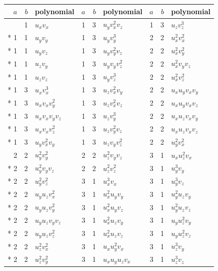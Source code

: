 \documentclass[10pt,a4paper]{article}
\makeatletter
\def\grouprule#1#2{\noalign{\marks\LTgroupmarks{\the\belowrulesep}\nobreak\vskip#1%
  \vskip\aboverulesep}\multispan\LT@cols\unskip{\leaders\hrule\@height#2\hfill\kern\z@}\cr
  \noalign{\penalty\LTrulebreak\vskip\belowrulesep\global\@lastruleclass\z@}}
\numberwithin{equation}{section}
\makeatother
\begin{document}
{\small\renewcommand{\arraystretch}{1.2}\begin{longtable}{@{}rrl@{\hspace{18pt}}rrl@{\hspace{18pt}}rrl@{}}\toprule
$a$ & $b$ & polynomial & $a$ & $b$ & polynomial & $a$ & $b$ & polynomial\\\midrule\endhead
\bottomrule\endfoot\endlastfoot
1 & 1 & $u_{x}v_{x}$ & 1 & 3 & $u_{y}v_{x}^{2}v_{z}$ & 1 & 3 & $u_{z}v_{z}^{3}$\\*
1 & 1 & $u_{y}v_{y}$ & 1 & 3 & $u_{y}v_{y}^{3}$ & 2 & 2 & $u_{x}^{2}v_{x}^{2}$\\*
1 & 1 & $u_{y}v_{z}$ & 1 & 3 & $u_{y}v_{y}^{2}v_{z}$ & 2 & 2 & $u_{x}^{2}v_{y}^{2}$\\*
1 & 1 & $u_{z}v_{y}$ & 1 & 3 & $u_{y}v_{y}v_{z}^{2}$ & 2 & 2 & $u_{x}^{2}v_{y}v_{z}$\\*
1 & 1 & $u_{z}v_{z}$ & 1 & 3 & $u_{y}v_{z}^{3}$ & 2 & 2 & $u_{x}^{2}v_{z}^{2}$\\*
1 & 3 & $u_{x}v_{x}^{3}$ & 1 & 3 & $u_{z}v_{x}^{2}v_{y}$ & 2 & 2 & $u_{x}u_{y}v_{x}v_{y}$\\*
1 & 3 & $u_{x}v_{x}v_{y}^{2}$ & 1 & 3 & $u_{z}v_{x}^{2}v_{z}$ & 2 & 2 & $u_{x}u_{y}v_{x}v_{z}$\\*
1 & 3 & $u_{x}v_{x}v_{y}v_{z}$ & 1 & 3 & $u_{z}v_{y}^{3}$ & 2 & 2 & $u_{x}u_{z}v_{x}v_{y}$\\*
1 & 3 & $u_{x}v_{x}v_{z}^{2}$ & 1 & 3 & $u_{z}v_{y}^{2}v_{z}$ & 2 & 2 & $u_{x}u_{z}v_{x}v_{z}$\\*
1 & 3 & $u_{y}v_{x}^{2}v_{y}$ & 1 & 3 & $u_{z}v_{y}v_{z}^{2}$ & 2 & 2 & $u_{y}^{2}v_{x}^{2}$\\
\grouprule{0pt}{\heavyrulewidth}
2 & 2 & $u_{y}^{2}v_{y}^{2}$ & 2 & 2 & $u_{z}^{2}v_{y}v_{z}$ & 3 & 1 & $u_{x}u_{z}^{2}v_{x}$\\*
2 & 2 & $u_{y}^{2}v_{y}v_{z}$ & 2 & 2 & $u_{z}^{2}v_{z}^{2}$ & 3 & 1 & $u_{y}^{3}v_{y}$\\*
2 & 2 & $u_{y}^{2}v_{z}^{2}$ & 3 & 1 & $u_{x}^{3}v_{x}$ & 3 & 1 & $u_{y}^{3}v_{z}$\\*
2 & 2 & $u_{y}u_{z}v_{x}^{2}$ & 3 & 1 & $u_{x}^{2}u_{y}v_{y}$ & 3 & 1 & $u_{y}^{2}u_{z}v_{y}$\\*
2 & 2 & $u_{y}u_{z}v_{y}^{2}$ & 3 & 1 & $u_{x}^{2}u_{y}v_{z}$ & 3 & 1 & $u_{y}^{2}u_{z}v_{z}$\\*
2 & 2 & $u_{y}u_{z}v_{y}v_{z}$ & 3 & 1 & $u_{x}^{2}u_{z}v_{y}$ & 3 & 1 & $u_{y}u_{z}^{2}v_{y}$\\*
2 & 2 & $u_{y}u_{z}v_{z}^{2}$ & 3 & 1 & $u_{x}^{2}u_{z}v_{z}$ & 3 & 1 & $u_{y}u_{z}^{2}v_{z}$\\*
2 & 2 & $u_{z}^{2}v_{x}^{2}$ & 3 & 1 & $u_{x}u_{y}^{2}v_{x}$ & 3 & 1 & $u_{z}^{3}v_{y}$\\*
2 & 2 & $u_{z}^{2}v_{y}^{2}$ & 3 & 1 & $u_{x}u_{y}u_{z}v_{x}$ & 3 & 1 & $u_{z}^{3}v_{z}$\\
\bottomrule\end{longtable}}
\end{document}

